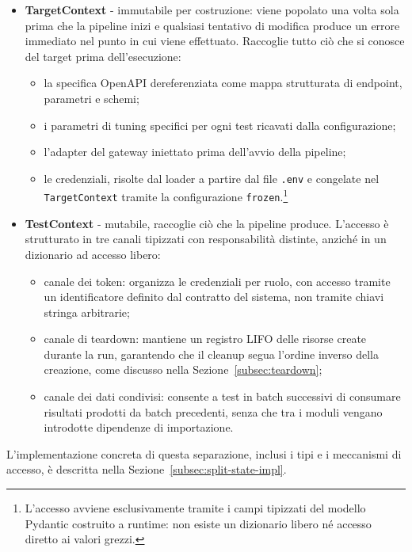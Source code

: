 \begin{itemize}
      \item \textbf{TargetContext} - immutabile per costruzione: viene popolato una volta sola prima che la pipeline inizi e qualsiasi tentativo di modifica produce un errore immediato nel punto in cui viene effettuato. Raccoglie tutto ciò che si conosce del target prima dell'esecuzione:
            \begin{itemize}
                  \item la specifica OpenAPI dereferenziata come mappa strutturata di endpoint, parametri e schemi;
                  \item i parametri di tuning specifici per ogni test ricavati dalla configurazione;
                  \item l'adapter del gateway iniettato prima dell'avvio della pipeline;
                  \item le credenziali, risolte dal loader a partire dal file \texttt{.env} e congelate nel \texttt{TargetContext} tramite la configurazione \texttt{frozen}.\footnote{L'accesso avviene esclusivamente tramite i campi tipizzati del modello Pydantic costruito a runtime: non esiste un dizionario libero né accesso diretto ai valori grezzi.}
            \end{itemize}
      \item \textbf{TestContext} - mutabile, raccoglie ciò che la pipeline produce. L'accesso è strutturato in tre canali tipizzati con responsabilità distinte, anziché in un dizionario ad accesso libero:
            \begin{itemize}
                  \item canale dei token: organizza le credenziali per ruolo, con accesso tramite un identificatore definito dal contratto del sistema, non tramite chiavi stringa arbitrarie;
                  \item canale di teardown: mantiene un registro \gls{LIFO} delle risorse create durante la run, garantendo che il cleanup segua l'ordine inverso della creazione, come discusso nella Sezione~\ref{subsec:teardown};
                  \item canale dei dati condivisi: consente a test in batch successivi di consumare risultati prodotti da batch precedenti, senza che tra i moduli vengano introdotte dipendenze di importazione.
            \end{itemize}
\end{itemize}

L'implementazione concreta di questa separazione, inclusi i tipi e i meccanismi di accesso, è descritta nella Sezione~\ref{subsec:split-state-impl}.


